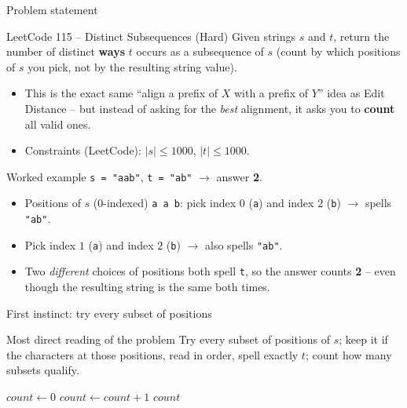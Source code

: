 \documentclass[11pt,aspectratio=169]{beamer}
\begin{document}
\begin{frame}{Problem statement}
  \begin{block}{LeetCode 115 -- Distinct Subsequences (\textcolor{red!60!black}{Hard})}
    Given strings $s$ and $t$, return the number of distinct \textbf{ways} $t$ occurs as
    a subsequence of $s$ (count by which positions of $s$ you pick, not by the resulting
    string value).
  \end{block}
  \begin{itemize}
    \item This is the exact same ``align a prefix of $X$ with a prefix of $Y$'' idea as
    Edit Distance -- but instead of asking for the \emph{best} alignment, it asks you to
    \textbf{count} all valid ones.
    \item Constraints (LeetCode): $|s| \le 1000$, $|t| \le 1000$.
  \end{itemize}
\end{frame}

\begin{frame}{Worked example}
  \texttt{s = "aab"}, \texttt{t = "ab"} $\to$ answer \textbf{2}.
  \begin{itemize}
    \item Positions of $s$ (0-indexed) \texttt{a a b}: pick index $0$ (\texttt{a}) and
    index $2$ (\texttt{b}) $\to$ spells \texttt{"ab"}.
    \item Pick index $1$ (\texttt{a}) and index $2$ (\texttt{b}) $\to$ also spells
    \texttt{"ab"}.
    \item Two \emph{different} choices of positions both spell \texttt{t}, so the answer
    counts \textbf{2} -- even though the resulting string is the same both times.
  \end{itemize}
\end{frame}

\begin{frame}{First instinct: try every subset of positions}
  \begin{block}{Most direct reading of the problem}
    Try every subset of positions of $s$; keep it if the characters at those positions,
    read in order, spell exactly $t$; count how many subsets qualify.
  \end{block}
  \begin{algorithmic}[1]
    \State $count \gets 0$
        \State $count \gets count + 1$
      \EndIf
    \EndFor
    \State \Return $count$
  \end{algorithmic}
\end{frame}
\end{document}

